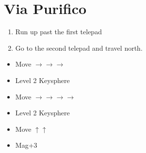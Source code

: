\chapter{Via Purifico}

\begin{enumerate}
	\item Run up past the first telepad
	\item Go to the second telepad and travel north.
\end{enumerate}
\bothvfill
\winvfill
\begin{spheregrid}
	\begin{itemize}
		\auronf
		\begin{itemize}
			\item Move $\rightarrow\rightarrow\rightarrow$
			\item Level 2 Keysphere
			\item Move $\rightarrow\rightarrow\rightarrow\rightarrow$
			\item Level 2 Keysphere
			\item Move $\uparrow\uparrow$
			\item Mag+3
		\end{itemize}
		\yunaf

\end{itemize}
\end{spheregrid}
